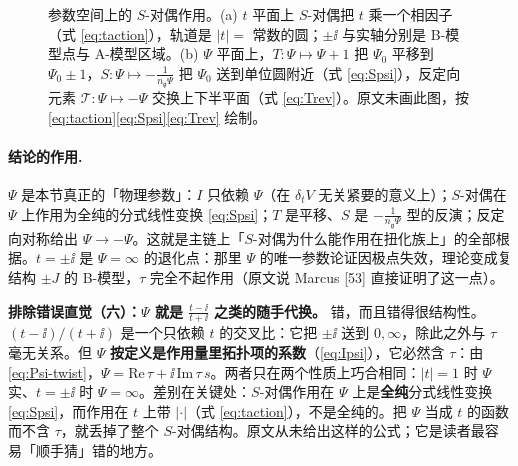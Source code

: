 \begin{figure}[htbp]
\caption{参数空间上的 $S$-对偶作用。(a) $t$ 平面上 $S$-对偶把 $t$ 乘一个相因子（式 \eqref{eq:taction}），轨道是 $|t|=$ 常数的圆；$\pm\ii$ 与实轴分别是 B-模型点与 A-模型区域。(b) $\Psi$ 平面上，$T:\Psi\mapsto\Psi+1$ 把 $\Psi_0$ 平移到 $\Psi_0\pm1$，$S:\Psi\mapsto-\frac{1}{n_{\mathfrak g}\Psi}$ 把 $\Psi_0$ 送到单位圆附近（式 \eqref{eq:Spsi}），反定向元素 $\mathcal T:\Psi\mapsto-\Psi$ 交换上下半平面（式 \eqref{eq:Trev}）。原文未画此图，按 \eqref{eq:taction}\eqref{eq:Spsi}\eqref{eq:Trev} 绘制\pB{}。}
\label{fig:pspace}
\end{figure}

\paragraph{结论的作用.}
$\Psi$ 是本节真正的「物理参数」：$I$ 只依赖 $\Psi$（在 $\delta_tV$ 无关紧要的意义上）；$S$-对偶在 $\Psi$ 上作用为全纯的分式线性变换 \eqref{eq:Spsi}；$T$ 是平移、$S$ 是 $-\frac{1}{n_{\mathfrak g}\Psi}$ 型的反演；反定向对称给出 $\Psi\to-\Psi$。这就是主链上「$S$-对偶为什么能作用在扭化族上」的全部根据。$t=\pm\ii$ 是 $\Psi=\infty$ 的退化点：那里 $\Psi$ 的唯一参数论证因极点失效，理论变成复结构 $\pm J$ 的 B-模型，$\tau$ 完全不起作用（原文说 Marcus [53] 直接证明了这一点）\pA{}。

\begin{warn}
\textbf{排除错误直觉（六）：$\Psi$ 就是 $\frac{t-\ii}{t+\ii}$ 之类的随手代换。} 错，而且错得很结构性。$(t-\ii)/(t+\ii)$ 是一个只依赖 $t$ 的交叉比：它把 $\pm\ii$ 送到 $0,\infty$，除此之外与 $\tau$ 毫无关系。但 $\Psi$ \textbf{按定义是作用量里拓扑项的系数}（\eqref{eq:Ipsi}），它必然含 $\tau$：由 \eqref{eq:Psi-twist}，$\Psi=\mathrm{Re}\,\tau+\ii\,\mathrm{Im}\,\tau\,s$。两者只在两个性质上巧合相同：$|t|=1$ 时 $\Psi$ 实、$t=\pm\ii$ 时 $\Psi=\infty$。差别在关键处：$S$-对偶作用在 $\Psi$ 上是\textbf{全纯}分式线性变换 \eqref{eq:Spsi}，而作用在 $t$ 上带 $|\cdot|$（式 \eqref{eq:taction}），不是全纯的。把 $\Psi$ 当成 $t$ 的函数而不含 $\tau$，就丢掉了整个 $S$-对偶结构。原文从未给出这样的公式；它是读者最容易「顺手猜」错的地方\pC。
\end{warn}

